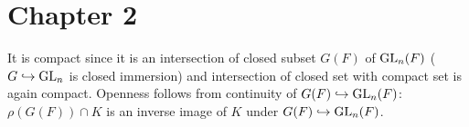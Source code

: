 \newpage
\section{Chapter 2}

\begin{problem} \notfinish
\end{problem}
\begin{problem} \notfinish
\end{problem}

\begin{problem}
It is compact since it is an intersection of closed subset $G(F)$ of $\operatorname{\mathrm{GL}}_{n}(F)$ ($G \hookrightarrow \operatorname{\mathrm{GL}}_{n}$ is closed immersion)
and intersection of closed set with compact set is again compact.
Openness follows from continuity of $G(F) \hookrightarrow \operatorname{\mathrm{GL}}_{n}(F)$: $\rho(G(F)) \cap K$ is an inverse image of $K$ under $G(F) \hookrightarrow \operatorname{\mathrm{GL}}_{n}(F)$.
\end{problem}

\begin{problem} \notfinish
\end{problem}

